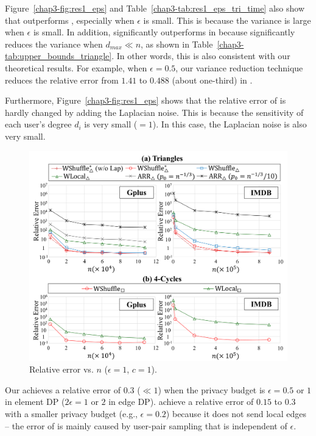 Figure~\ref{chap3-fig:res1_eps} and Table~\ref{chap3-tab:res1_eps_tri_time} also show that \AlgWSTriVR{} outperforms \AlgWSTri{}, especially when $\epsilon$ is small. 
This is because the variance is large when $\epsilon$ is small. 
In addition, \AlgWSTriVR{} significantly outperforms \AlgWSTri{} in \IMDB{} because \AlgWSTriVR{} significantly reduces the variance when $d_{max} \ll n$, as shown in Table~\ref{chap3-tab:upper_bounds_triangle}. 
In other words, this is also consistent with our theoretical results. 
For example, when $\epsilon=0.5$, our variance reduction technique reduces the relative error from $1.41$ to $0.488$ (about one-third) in \IMDB{}. 

Furthermore, Figure~\ref{chap3-fig:res1_eps} shows that the relative error of \AlgWSTriVR{} is hardly changed by adding the Laplacian noise. 
This is because the sensitivity of each user's degree $d_i$ is very small ($=1$). 
In this case, the Laplacian noise is also very small. 

\begin{figure}[t]
  \centering
  \includegraphics[width=0.99\linewidth]{fig/res2_n.pdf}
  \vspace{-4mm}
  \caption{Relative error vs. $n$ ($\epsilon=1$, $c=1$).
  }
  \label{chap3-fig:res2_n}
\end{figure}

Our \AlgWSTriVR{} achieves a relative error of $0.3$ ($\ll 1$) 
when the privacy budget is $\epsilon = 0.5$ or $1$ in element DP ($2\epsilon = 1$ or $2$ in edge DP). 
\AlgWSCyc{} achieve a relative error of $0.15$ to $0.3$ with a smaller privacy budget (e.g., $\epsilon = 0.2$) because it  does not send local edges -- the error of \AlgWSCyc{} is mainly caused by user-pair sampling that is independent of $\epsilon$. 

